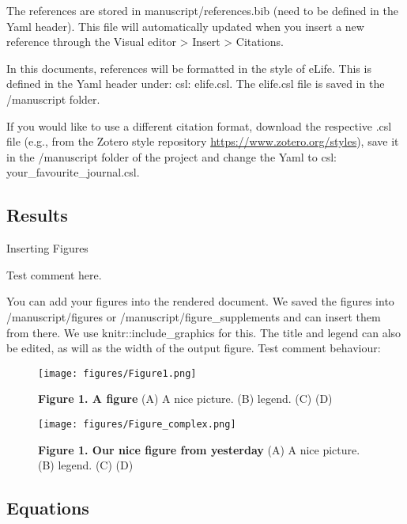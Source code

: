 \documentclass[
  11pt,
]{article}
\begin{document}
The references are stored in manuscript/references.bib (need to be
defined in the Yaml header). This file will automatically updated when
you insert a new reference through the Visual editor \textgreater{}
Insert \textgreater{} Citations.

In this documents, references will be formatted in the style of eLife.
This is defined in the Yaml header under: csl: elife.csl. The elife.csl
file is saved in the /manuscript folder.

If you would like to use a different citation format, download the
respective .csl file (e.g., from the Zotero style repository
\url{https://www.zotero.org/styles}), save it in the /manuscript folder
of the project and change the Yaml to csl: your\_favourite\_journal.csl.

\subsection{Results}\label{results}

Inserting Figures

Test comment here.

You can add your figures into the rendered document. We saved the
figures into /manuscript/figures or /manuscript/figure\_supplements and
can insert them from there. We use knitr::include\_graphics for this.
The title and legend can also be edited, as will as the width of the
output figure. Test comment behaviour:

\begin{figure}[H]

{\centering \texttt{[image: figures/Figure1.png]}

}

\caption{\textbf{Figure 1. A figure} (A) A nice picture. (B) legend. (C)
(D)}

\end{figure}%

\begin{figure}[H]

{\centering \texttt{[image: figures/Figure\_complex.png]}

}

\caption{\textbf{Figure 1. Our nice figure from yesterday} (A) A nice
picture. (B) legend. (C) (D)}

\end{figure}%

\subsection{Equations}\label{equations}
\end{document}
